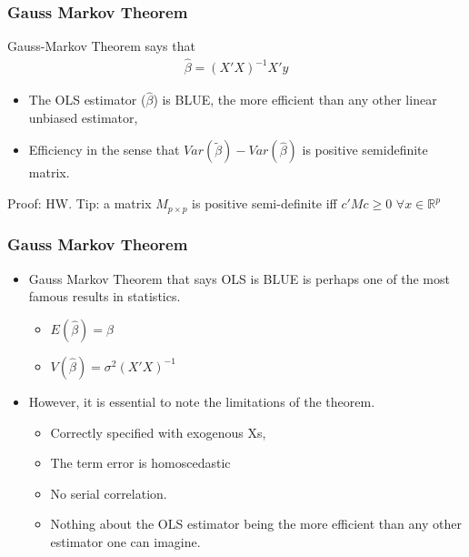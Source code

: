 \documentclass[
  shownotes,
  xcolor={svgnames},
  hyperref={colorlinks,citecolor=DarkBlue,linkcolor=DarkRed,urlcolor=DarkBlue}
  ]{beamer}
\begin{document}
\begin{frame}
\frametitle{Gauss Markov Theorem}


Gauss-Markov Theorem says that 
\bigskip
\begin{align}
 \hat \beta = (X'X)^{-1} X'y
\end{align}

\bigskip

\begin{itemize}
  \item The OLS estimator ($\hat \beta$) is BLUE, the more efficient than any other linear unbiased estimator, 
  \medskip
  \item Efficiency in the sense that  $Var(\tilde \beta) - Var(\hat \beta)$ is positive semidefinite matrix.
\end{itemize}

\bigskip
\tiny Proof: HW. Tip: a matrix $M_{p\times p}$ is positive semi-definite iff $c'Mc\geq0$ $\forall x\in \mathbb{R}^p$

\end{frame}


\begin{frame}
\frametitle{Gauss Markov Theorem}

\begin{itemize}
  \item Gauss Markov Theorem that says OLS is BLUE is perhaps one of the most famous results in statistics. 
  
  \begin{itemize}
    \item $E(\hat\beta) = \beta$
    \medskip 
    \item $V(\hat \beta ) = \sigma^2 (X'X)^{-1}$
  \end{itemize}
  
\bigskip
  \item However, it is essential to note the limitations of the theorem. 

  \begin{itemize}
    \footnotesize
    \item Correctly specified with exogenous Xs, 
      \medskip 
    \item The term error is homoscedastic 
      \medskip 
    \item No serial correlation.
      \medskip 
    \item Nothing about the OLS estimator being the more efficient than any other estimator one can imagine.
  \end{itemize}
    
  

\end{itemize}

\end{frame}
\end{document}
